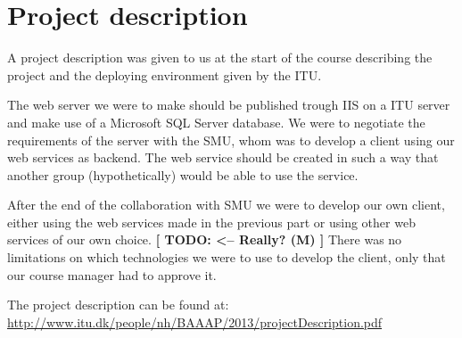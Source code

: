 \section{Project description}
A project description was given to us at the start of the course describing the project and the deploying environment given by the ITU.

The web server we were to make should be published trough IIS on a ITU server and make use of a Microsoft SQL Server database.
We were to negotiate the requirements of the server with the SMU, whom was to develop a client using our web services as backend.
The web service should be created in such a way that another group  (hypothetically) would be able to use the service.

After the end of the collaboration with SMU we were to develop our own client, either using the web services made in the previous part or using other web services of our own choice. \textbf{[ TODO: <-- Really? (M) ]}
There was no limitations on which technologies we were to use to develop the client, only that our course manager had to approve it.

The project description can be found at: \url{http://www.itu.dk/people/nh/BAAAP/2013/projectDescription.pdf}
\newpage